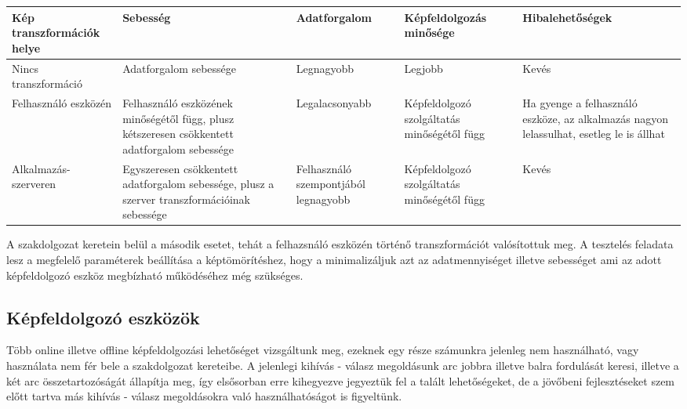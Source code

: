 \begin{center}
	\begin{tabular}{|p{2cm}|p{3cm} |p{3cm} | p{3cm}|p{3cm}|}
   	\hline
	\textbf{Kép transzformációk helye} & \textbf{Sebesség} & \textbf{Adatforgalom} & \textbf{Képfeldolgozás minősége} &\textbf{ Hibalehetőségek} \\ \hline
	Nincs transzformáció & Adatforgalom sebessége & Legnagyobb & Legjobb & Kevés \\ \hline
	Felhasználó eszközén & Felhasználó eszközének minőségétől függ, plusz kétszeresen csökkentett adatforgalom sebessége & Legalacsonyabb & Képfeldolgozó szolgáltatás minőségétől függ & Ha gyenge a felhasználó eszköze, az alkalmazás nagyon lelassulhat, esetleg le is állhat \\ \hline
	Alkalmazás-szerveren & Egyszeresen csökkentett adatforgalom sebessége, plusz a szerver transzformációinak sebessége & Felhasználó szempontjából legnagyobb & Képfeldolgozó szolgáltatás minőségétől függ & Kevés\\ \hline
	\end{tabular}
\end{center}

A szakdolgozat keretein belül a második esetet, tehát a felhazsnáló eszközén történő transzformációt valósítottuk meg. A tesztelés feladata lesz a megfelelő paraméterek beállítása a képtömörítéshez, hogy a minimalizáljuk azt az adatmennyiséget illetve sebességet ami az adott képfeldolgozó eszköz megbízható működéséhez még szükséges.

\subsection{Képfeldolgozó eszközök}
Több online illetve offline képfeldolgozási lehetőséget vizsgáltunk meg, ezeknek egy része számunkra jelenleg nem használható, vagy használata nem fér bele a szakdolgozat kereteibe. A jelenlegi kihívás - válasz megoldásunk arc jobbra illetve balra fordulását keresi, illetve a két arc összetartozóságát állapítja meg, így elsősorban erre kihegyezve jegyeztük fel a talált lehetőségeket, de a jövőbeni fejlesztéseket szem előtt tartva más kihívás - válasz megoldásokra való használhatóságot is figyeltünk.
